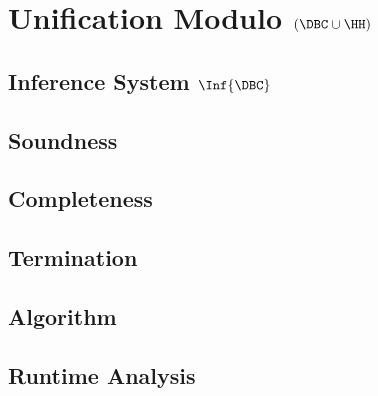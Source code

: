 \chapter{Unification Modulo \texorpdfstring{$(\DBC \cup \HH)$}{(DBC U H)}}\label{chap:unif-dbcuh}

\section{Inference System \texorpdfstring{$\Inf{\DBC}$}{IDBC}}\label{sec:inf-dbc}

\section{Soundness}\label{sec:dbc-soundness}

\section{Completeness}\label{sec:dbc-completeness}

\section{Termination}\label{sec:dbc-termination}

\section{Algorithm}\label{sec:dbc-algorithm}

\section{Runtime Analysis}\label{sec:dbc-runtime-analysis}

